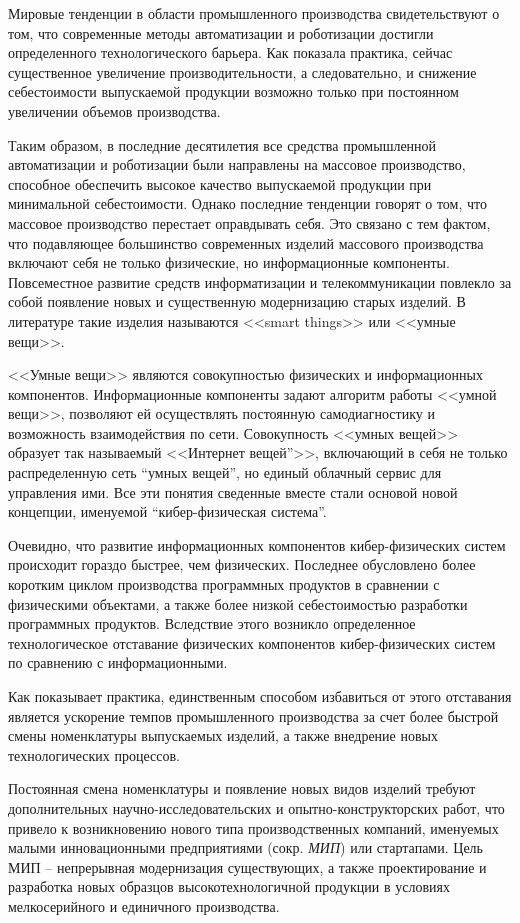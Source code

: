 
{\actuality} Мировые тенденции в области промышленного производства свидетельствуют о том, что современные методы автоматизации и роботизации достигли определенного технологического барьера. Как показала практика, сейчас существенное увеличение производительности, а следовательно, и снижение себестоимости выпускаемой продукции возможно только при постоянном увеличении объемов производства.

Таким образом, в последние десятилетия все средства промышленной автоматизации и роботизации были направлены на массовое производство, способное обеспечить высокое качество выпускаемой продукции при минимальной себестоимости. Однако последние тенденции говорят о том, что массовое производство перестает оправдывать себя. Это связано с тем фактом, что подавляющее большинство современных изделий массового производства включают себя не только физические, но информационные компоненты. Повсеместное развитие средств информатизации и телекоммуникации повлекло за собой появление новых и существенную модернизацию старых изделий. В литературе такие изделия называются <<smart things>> или <<умные вещи>>. 

<<Умные вещи>> являются совокупностью физических и информационных компонентов. Информационные компоненты задают алгоритм работы <<умной вещи>>, позволяют ей осуществлять постоянную самодиагностику и возможность взаимодействия по сети.  Совокупность <<умных вещей>> образует так называемый <<Интернет вещей”>>, включающий в себя не только распределенную сеть “умных вещей”, но единый облачный сервис для управления ими. Все эти понятия сведенные вместе стали основой новой концепции, именуемой “кибер-физическая система”.

Очевидно, что развитие информационных компонентов кибер-физических систем происходит гораздо быстрее, чем физических. Последнее обусловлено более коротким циклом производства программных продуктов в сравнении с физическими объектами, а также более низкой себестоимостью разработки программных продуктов. Вследствие этого возникло определенное технологическое отставание физических компонентов кибер-физических систем по сравнению с информационными.

Как показывает практика, единственным способом избавиться от этого отставания является ускорение темпов промышленного производства за счет более быстрой смены номенклатуры выпускаемых изделий, а также внедрение новых технологических процессов.

Постоянная смена номенклатуры и появление новых видов изделий требуют дополнительных научно-исследовательских и опытно-конструкторских работ, что привело к возникновению нового типа производственных компаний, именуемых малыми инновационными предприятиями (сокр. \textit{МИП}) или стартапами. Цель МИП – непрерывная модернизация существующих, а также проектирование и разработка новых образцов высокотехнологичной продукции в условиях мелкосерийного и единичного производства.

